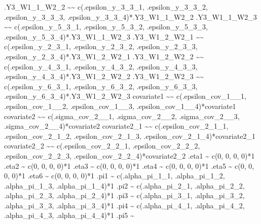 \documentclass[
]{book}
\newenvironment{Shaded}{\begin{snugshade}}{\end{snugshade}}
\newcommand{\StringTok}[1]{\textcolor[rgb]{0.31,0.60,0.02}{#1}}
\begin{document}
\begin{Shaded}
\begin{Highlighting}[]
\StringTok{.Y3\_W1\_1\_W2\_2 \textasciitilde{}\textasciitilde{}}
\StringTok{    c(.epsilon\_y\_3\_3\_1, .epsilon\_y\_3\_3\_2, .epsilon\_y\_3\_3\_3, .epsilon\_y\_3\_3\_4)*.Y3\_W1\_1\_W2\_2}
\StringTok{.Y3\_W1\_1\_W2\_3 \textasciitilde{}\textasciitilde{}}
\StringTok{    c(.epsilon\_y\_5\_3\_1, .epsilon\_y\_5\_3\_2, .epsilon\_y\_5\_3\_3, .epsilon\_y\_5\_3\_4)*.Y3\_W1\_1\_W2\_3}
\StringTok{.Y3\_W1\_2\_W2\_1 \textasciitilde{}\textasciitilde{}}
\StringTok{    c(.epsilon\_y\_2\_3\_1, .epsilon\_y\_2\_3\_2, .epsilon\_y\_2\_3\_3, .epsilon\_y\_2\_3\_4)*.Y3\_W1\_2\_W2\_1}
\StringTok{.Y3\_W1\_2\_W2\_2 \textasciitilde{}\textasciitilde{}}
\StringTok{    c(.epsilon\_y\_4\_3\_1, .epsilon\_y\_4\_3\_2, .epsilon\_y\_4\_3\_3, .epsilon\_y\_4\_3\_4)*.Y3\_W1\_2\_W2\_2}
\StringTok{.Y3\_W1\_2\_W2\_3 \textasciitilde{}\textasciitilde{}}
\StringTok{    c(.epsilon\_y\_6\_3\_1, .epsilon\_y\_6\_3\_2, .epsilon\_y\_6\_3\_3, .epsilon\_y\_6\_3\_4)*.Y3\_W1\_2\_W2\_3}
\StringTok{covariate1 \textasciitilde{}\textasciitilde{}}
\StringTok{    c(.epsilon\_cov\_1\_\_1, .epsilon\_cov\_1\_\_2, .epsilon\_cov\_1\_\_3, .epsilon\_cov\_1\_\_4)*covariate1}
\StringTok{covariate2 \textasciitilde{}\textasciitilde{}}
\StringTok{    c(.sigma\_cov\_2\_\_1, .sigma\_cov\_2\_\_2, .sigma\_cov\_2\_\_3, .sigma\_cov\_2\_\_4)*covariate2}
\StringTok{covariate2\_1 \textasciitilde{}\textasciitilde{}}
\StringTok{    c(.epsilon\_cov\_2\_1\_1, .epsilon\_cov\_2\_1\_2, .epsilon\_cov\_2\_1\_3, .epsilon\_cov\_2\_1\_4)*covariate2\_1}
\StringTok{covariate2\_2 \textasciitilde{}\textasciitilde{}}
\StringTok{    c(.epsilon\_cov\_2\_2\_1, .epsilon\_cov\_2\_2\_2, .epsilon\_cov\_2\_2\_3, .epsilon\_cov\_2\_2\_4)*covariate2\_2}
\StringTok{.eta1 \textasciitilde{}}
\StringTok{    c(0, 0, 0, 0)*1}
\StringTok{.eta2 \textasciitilde{}}
\StringTok{    c(0, 0, 0, 0)*1}
\StringTok{.eta3 \textasciitilde{}}
\StringTok{    c(0, 0, 0, 0)*1}
\StringTok{.eta4 \textasciitilde{}}
\StringTok{    c(0, 0, 0, 0)*1}
\StringTok{.eta5 \textasciitilde{}}
\StringTok{    c(0, 0, 0, 0)*1}
\StringTok{.eta6 \textasciitilde{}}
\StringTok{    c(0, 0, 0, 0)*1}
\StringTok{.pi1 \textasciitilde{}}
\StringTok{    c(.alpha\_pi\_1\_1, .alpha\_pi\_1\_2, .alpha\_pi\_1\_3, .alpha\_pi\_1\_4)*1}
\StringTok{.pi2 \textasciitilde{}}
\StringTok{    c(.alpha\_pi\_2\_1, .alpha\_pi\_2\_2, .alpha\_pi\_2\_3, .alpha\_pi\_2\_4)*1}
\StringTok{.pi3 \textasciitilde{}}
\StringTok{    c(.alpha\_pi\_3\_1, .alpha\_pi\_3\_2, .alpha\_pi\_3\_3, .alpha\_pi\_3\_4)*1}
\StringTok{.pi4 \textasciitilde{}}
\StringTok{    c(.alpha\_pi\_4\_1, .alpha\_pi\_4\_2, .alpha\_pi\_4\_3, .alpha\_pi\_4\_4)*1}
\StringTok{.pi5 \textasciitilde{}}

\end{Highlighting}
\end{Shaded}
\end{document}
